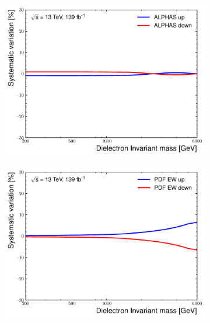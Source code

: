 \begin{figure}[h!]
\begin{subfigure}[h]{0.42\textwidth}
        \label{fig:uncert:mmEW}
    \end{subfigure}
    \begin{subfigure}[h]{0.42\textwidth}
        \includegraphics[width=\textwidth]{figures/analysis/datamc/Uncertainties/theory/ee/backgroundTemplate_KF_ALPHAS__1up.pdf}
        \label{fig:uncert:eealpha}
    \end{subfigure}
    \begin{subfigure}[h]{0.42\textwidth}
        \centering
        \includegraphics[width=\textwidth]{figures/analysis/datamc/Uncertainties/theory/ee/backgroundTemplate_KF_PDF_EW__1up.pdf}

\end{subfigure}
\end{figure}
